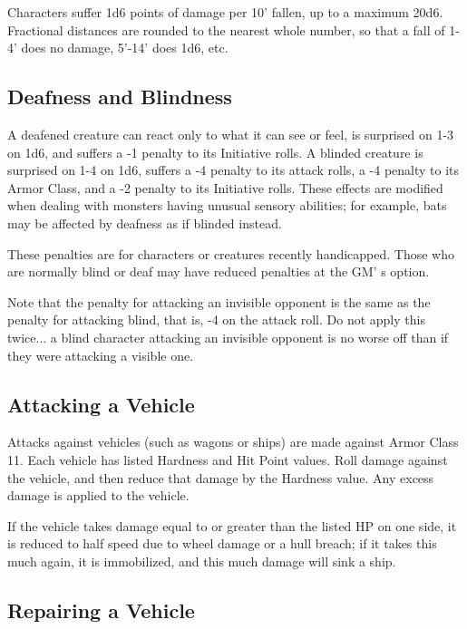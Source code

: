 \documentclass[a4paper,twoside,openany,10pt]{book}
\begin{document}
\begin{multicols}{2}
Characters suffer 1d6 points of damage per 10' fallen, up to a maximum 20d6. Fractional distances are rounded to the nearest whole number, so that a fall of 1-4' does no damage, 5'-14' does 1d6, etc.

\subsection{Deafness and Blindness}\label{deafness-and-blindness}

A deafened creature can react only to what it can see or feel, is surprised on 1-3 on 1d6, and suffers a -1 penalty to its Initiative rolls. A blinded creature is surprised on 1-4 on 1d6, suffers a -4 penalty to its attack rolls, a -4 penalty to its Armor Class, and a -2 penalty to its Initiative rolls. These effects are modified when dealing with monsters having unusual sensory abilities; for example, bats may be affected by deafness as if blinded instead.

These penalties are for characters or creatures recently handicapped. Those who are normally blind or deaf may have reduced penalties at the GM' s option.

Note that the penalty for attacking an invisible opponent is the same as the penalty for attacking blind, that is, -4 on the attack roll. Do not apply this twice... a blind character attacking an invisible opponent is no worse off than if they were attacking a visible one.

\subsection{Attacking a Vehicle}\label{attacking-a-vehicle}

Attacks against vehicles (such as wagons or ships) are made against Armor Class 11. Each vehicle has listed Hardness and Hit Point values. Roll damage against the vehicle, and then reduce that damage by the Hardness value. Any excess damage is applied to the vehicle.

If the vehicle takes damage equal to or greater than the listed HP on one side, it is reduced to half speed due to wheel damage or a hull breach; if it takes this much again, it is immobilized, and this much damage will sink a ship.

\subsection{Repairing a Vehicle}\label{repairing-a-vehicle}


\end{multicols}
\end{document}
